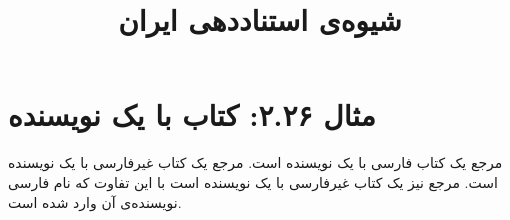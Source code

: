 \documentclass[a4paper,10pt]{article}
\begin{document}
\title{شیوه‌ی استناددهی ایران
 }
\author{}
\date{}
\maketitle



\section*{مثال ۲.۲۶: کتاب با یک نویسنده}

مرجع \cite{کمالزاده1388} یک کتاب فارسی با یک نویسنده است. مرجع \cite{kasper1999} یک کتاب غیرفارسی با یک نویسنده است. مرجع \cite{salinger1951} نیز یک کتاب غیرفارسی با یک نویسنده است با این تفاوت که نام فارسی نویسنده‌ی آن وارد شده است.






\end{document}
